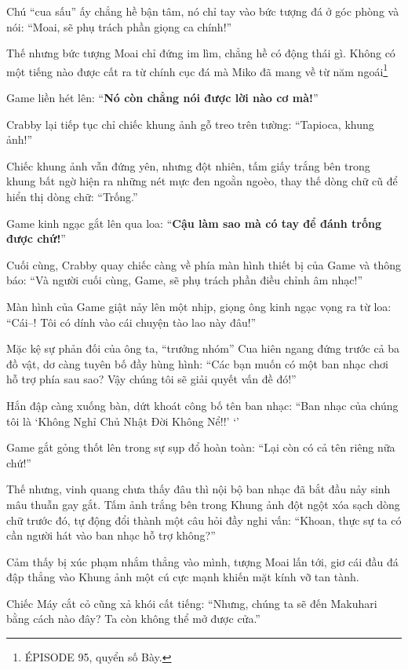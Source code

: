 \documentclass[../main.tex]{subfiles}
\begin{document}
Chú ``cua sấu'' ấy chẳng hề bận tâm, nó chỉ tay vào bức tượng đá ở góc phòng và nói: ``Moai, sẽ phụ trách phần giọng ca chính!''

Thế nhưng bức tượng Moai chỉ đứng im lìm, chẳng hề có động thái gì. Không có một tiếng nào được cất ra từ chính cục đá mà Miko đã mang về từ năm ngoái\footnote{{\flaregothic ÉPISODE 95}, quyển số Bày.}

Game liền hét lên: ``\textbf{Nó còn chẳng nói được lời nào cơ mà!}''


Crabby lại tiếp tục chỉ chiếc khung ảnh gỗ treo trên tường: ``Tapioca, khung ảnh!''

Chiếc khung ảnh vẫn đứng yên, nhưng đột nhiên, tấm giấy trắng bên trong khung bất ngờ hiện ra những nét mực đen ngoằn ngoèo, thay thế dòng chữ cũ để hiển thị dòng chữ: ``Trống.''

Game kinh ngạc gắt lên qua loa: ``\textbf{Cậu làm sao mà có tay để đánh trống được chứ!}''


Cuối cùng, Crabby quay chiếc càng về phía màn hình thiết bị của Game và thông báo: ``Và người cuối cùng, Game, sẽ phụ trách phần điều chỉnh âm nhạc!''

Màn hình của Game giật nảy lên một nhịp, giọng ông kinh ngạc vọng ra từ loa: ``Cái--! Tôi có dính vào cái chuyện tào lao này đâu!''

Mặc kệ sự phản đối của ông ta, ``trưởng nhóm'' Cua hiên ngang đứng trước cả ba đồ vật, dơ càng tuyên bố đầy hùng hình: ``Các bạn muốn có một ban nhạc chơi hỗ trợ phía sau sao? Vậy chúng tôi sẽ giải quyết vấn đề đó!''

Hắn đập càng xuống bàn, dứt khoát công bố tên ban nhạc: ``Ban nhạc của chúng tôi là `Không Nghỉ Chủ Nhật Đời Không Nể!!' `'

Game gắt gỏng thốt lên trong sự sụp đổ hoàn toàn: ``Lại còn có cả tên riêng nữa chứ!''


Thế nhưng, vinh quang chưa thấy đâu thì nội bộ ban nhạc đã bắt đầu nảy sinh mâu thuẫn gay gắt. Tấm ảnh trắng bên trong Khung ảnh đột ngột xóa sạch dòng chữ trước đó, tự động đổi thành một câu hỏi đầy nghi vấn: ``Khoan, thực sự ta có cần người hát vào ban nhạc hỗ trợ không?''

Cảm thấy bị xúc phạm nhắm thẳng vào mình, tượng Moai lấn tới, giơ cái đầu đá đập thẳng vào Khung ảnh một cú cực mạnh khiến mặt kính vỡ tan tành.

Chiếc Máy cắt cỏ cũng xả khói cất tiếng: ``Nhưng, chúng ta sẽ đến Makuhari bằng cách nào đây? Ta còn không thể mở được cửa.''
\end{document}
